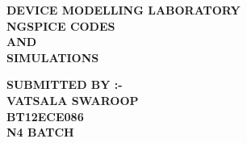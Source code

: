 \documentclass{article}
\begin{document}
\begin{center}
\Huge{{\bf\color{rosewood}DEVICE MODELLING LABORATORY}}\\
\vspace{30 mm}
\huge{{\bf\color{rosewood} NGSPICE CODES}}\\
\huge{{\bf\color{rosewood} AND }}\\
\huge{{\bf \color{rosewood}SIMULATIONS}}\\
\end{center}
\vspace{60mm}
\begin{flushright}
\LARGE{{\bf\color{rosewood}SUBMITTED BY :-}}\\
\LARGE{{\bf\color{rosewood} VATSALA  SWAROOP}}\\
\LARGE{{\bf\color{rosewood} BT12ECE086}}\\
\LARGE{{\bf\color{rosewood} N4 BATCH}}\\      
\end{flushright}    
\newpage  
\end{document}
